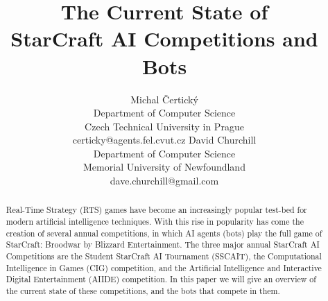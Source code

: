 \documentclass[letterpaper]{article} %
\begin{document}
\title{The Current State of \\StarCraft AI Competitions and Bots}
\author{Michal \v{C}ertick\'{y}\\
Department of Computer Science\\
Czech Technical University in Prague\\
certicky@agents.fel.cvut.cz
\And
David Churchill\\
Department of Computer Science\\
Memorial University of Newfoundland\\
dave.churchill@gmail.com
}
\maketitle
\begin{abstract}
Real-Time Strategy (RTS) games have become an increasingly popular test-bed for modern artificial intelligence techniques. With this rise in popularity has come the creation of several annual competitions, in which AI agents (bots) play the full game of StarCraft: Broodwar by Blizzard Entertainment. The three major annual StarCraft AI Competitions are the Student StarCraft AI Tournament (SSCAIT), the Computational Intelligence in Games (CIG) competition, and the Artificial Intelligence and Interactive Digital Entertainment (AIIDE) competition. In this paper we will give an overview of the current state of these competitions, and the bots that compete in them. 
\end{abstract}







 


{} 

\end{document}
